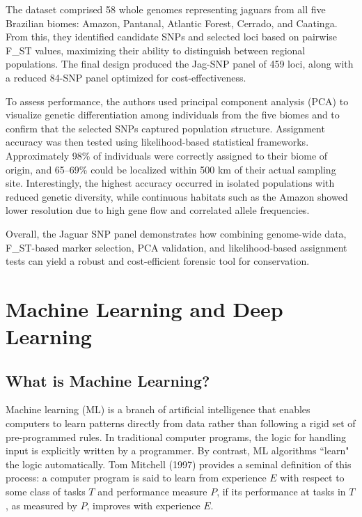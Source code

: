 The dataset comprised 58 whole genomes representing jaguars from all five Brazilian biomes: Amazon, Pantanal, Atlantic Forest, Cerrado, and Caatinga. From this, they identified candidate SNPs and selected loci based on pairwise F\_ST values, maximizing their ability to distinguish between regional populations. The final design produced the Jag-SNP panel of 459 loci, along with a reduced 84-SNP panel optimized for cost-effectiveness.

To assess performance, the authors used principal component analysis (PCA) to visualize genetic differentiation among individuals from the five biomes and to confirm that the selected SNPs captured population structure. Assignment accuracy was then tested using likelihood-based statistical frameworks. Approximately 98\% of individuals were correctly assigned to their biome of origin, and 65–69\% could be localized within 500 km of their actual sampling site. Interestingly, the highest accuracy occurred in isolated populations with reduced genetic diversity, while continuous habitats such as the Amazon showed lower resolution due to high gene flow and correlated allele frequencies.

Overall, the Jaguar SNP panel demonstrates how combining genome-wide data, F\_ST-based marker selection, PCA validation, and likelihood-based assignment tests can yield a robust and cost-efficient forensic tool for conservation.

\section{Machine Learning and Deep Learning}

\subsection{What is Machine Learning?}

Machine learning (ML) is a branch of artificial intelligence that enables computers to learn patterns directly from data rather than following a rigid set of pre-programmed rules. In traditional computer programs, the logic for handling input is explicitly written by a programmer. By contrast, ML algorithms ``learn" the logic automatically. Tom Mitchell (1997) \cite{mitchell1997machine} provides a seminal definition of this process: a computer program is said to learn from experience $E$ with respect to some class of tasks $T$ and performance measure $P$, if its performance at tasks in $T$, as measured by $P$, improves with experience $E$.

